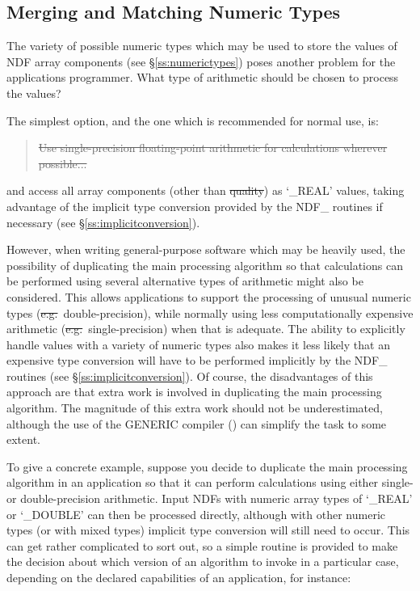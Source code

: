 \subsection{Merging and Matching Numeric Types}

The variety of possible numeric types which may be used to store the values
of NDF array components (see \S\ref{ss:numerictypes}) poses another problem
for the applications programmer. 
What type of arithmetic should be chosen to process the values?

The simplest option, and the one which is recommended for normal use, is:

\begin{quote}
\begin{center}
\st{Use single-precision floating-point arithmetic for calculations
wherever possible...} 
\end{center}
\end{quote}

and access all array components (other than \st{quality\/}) as `\_REAL'
values, taking advantage of the implicit type conversion provided by the
NDF\_ routines if necessary (see \S\ref{ss:implicitconversion}). 

However, when writing general-purpose software which may be heavily used,
the possibility of duplicating the main processing algorithm so that
calculations can be performed using several alternative types of arithmetic
might also be considered. 
This allows applications to support the processing of unusual numeric types
(\st{e.g.}\ double-precision), while normally using less computationally
expensive arithmetic (\st{e.g.}\ single-precision) when that is adequate. 
The ability to explicitly handle values with a variety of numeric types also
makes it less likely that an expensive type conversion will have to be
performed implicitly by the NDF\_ routines (see
\S\ref{ss:implicitconversion}). 
Of course, the disadvantages of this approach are that extra work is
involved in duplicating the main processing algorithm. 
The magnitude of this extra work should not be underestimated, although the
use of the GENERIC compiler () can simplify the
task to some extent.

To give a concrete example, suppose you decide to duplicate the main
processing algorithm in an application so that it can perform calculations
using either single- or double-precision arithmetic. 
Input NDFs with numeric array types of `\_REAL' or `\_DOUBLE' can then be
processed directly, although with other numeric types (or with mixed types)
implicit type conversion will still need to occur. 
This can get rather complicated to sort out, so a simple routine 
is provided to make the decision about which version of an algorithm to
invoke in a particular case, depending on the declared capabilities of an
application, for instance:

